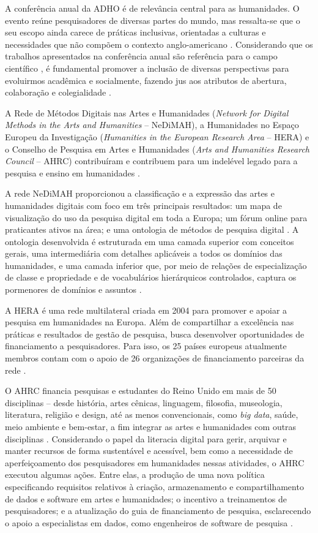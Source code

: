 \documentclass[portuguese]{textolivre}
\begin{document}
A conferência anual da ADHO é de relevância central para as humanidades. O evento reúne pesquisadores de diversas partes do mundo, mas ressalta-se que o seu escopo ainda carece de práticas inclusivas, orientadas a culturas e necessidades que não compõem o contexto anglo-americano \cite{estill2022,mahony2018}. Considerando que os trabalhos apresentados na conferência anual são referência para o campo científico \cite{du2019}, é fundamental promover a inclusão de diversas perspectivas para evoluirmos acadêmica e socialmente, fazendo jus aos atributos de abertura, colaboração e colegialidade \cite{poole2017}.

A Rede de Métodos Digitais nas Artes e Humanidades (\textit{Network for Digital Methods in the Arts and Humanities} – NeDiMAH), a Humanidades no Espaço Europeu da Investigação (\textit{Humanities in the European Research Area} – HERA) e o Conselho de Pesquisa em Artes e Humanidades (\textit{Arts and Humanities Research Council} – AHRC) contribuíram e contribuem para um indelével legado para a pesquisa e ensino em humanidades \cite{earnshaw2018}.

A rede NeDiMAH proporcionou a classificação e a expressão das artes e humanidades digitais com foco em três principais resultados: um mapa de visualização do uso da pesquisa digital em toda a Europa; um fórum online para praticantes ativos na área; e uma ontologia de métodos de pesquisa digital \cite{european_science_foundation2012}. A ontologia desenvolvida é estruturada em uma camada superior com conceitos gerais, uma intermediária com detalhes aplicáveis a todos os domínios das humanidades, e uma camada inferior que, por meio de relações de especialização de classe e propriedade e de vocabulários hierárquicos controlados, captura os pormenores de domínios e assuntos \cite{pertsas2017}.

A HERA é uma rede multilateral criada em 2004 para promover e apoiar a pesquisa em humanidades na Europa. Além de compartilhar a excelência nas práticas e resultados de gestão de pesquisa, busca desenvolver oportunidades de financiamento a pesquisadores. Para isso, os 25 países europeus atualmente membros contam com o apoio de 26 organizações de financiamento parceiras da rede \cite{hera2023}.

O AHRC financia pesquisas e estudantes do Reino Unido em mais de 50 disciplinas – desde história, artes cênicas, linguagem, filosofia, museologia, literatura, religião e design, até as menos convencionais, como \textit{big data}, saúde, meio ambiente e bem-estar, a fim integrar as artes e humanidades com outras disciplinas \cite{ahrc2018}. Considerando o papel da literacia digital para gerir, arquivar e manter recursos de forma sustentável e acessível, bem como a necessidade de aperfeiçoamento dos pesquisadores em humanidades nessas atividades, o AHRC executou algumas ações. Entre elas, a produção de uma nova política especificando requisitos relativos à criação, armazenamento e compartilhamento de dados e software em artes e humanidades; o incentivo a treinamentos de pesquisadores; e a atualização do guia de financiamento de pesquisa, esclarecendo o apoio a especialistas em dados, como engenheiros de software de pesquisa \cite{siewicz2022}.
\end{document}

